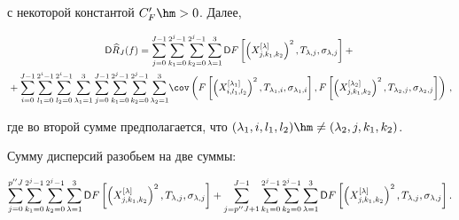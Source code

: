 с некоторой константой $C'_F\hm > 0$. Далее,


\begin{multline}                                                                        \label{Var_Struct}


\Variance \widehat{R}_J(f)


= \sum\limits_{j = 0}^{J - 1} \sum\limits_{k_1 = 0}^{2^j - 1}


\sum\limits_{k_2 = 0}^{2^j - 1} \sum\limits_{\lambda=1}^3


\Variance F\left[\left(X_{j,k_1,k_2}^{[\lambda]}\right)^2,T_{\lambda,j},\sigma_{\lambda,j}\right]+{}\\


{}+ \sum\limits_{i = 0}^{J - 1} \sum\limits_{l_1 = 0}^{2^i - 1}


\sum\limits_{l_2 = 0}^{2^i - 1} \sum\limits_{\lambda_1=1}^3


\sum\limits_{j = 0}^{J - 1}\sum\limits_{k_1 = 0}^{2^j - 1}


\sum\limits_{k_2 = 0}^{2^j - 1}\sum\limits_{\lambda_2=1}^3\!


\cov\left(F\left[\left(X_{i,l_1,l_2}^{[\lambda_1]}\right)^2,


T_{\lambda_1,i},


\sigma_{\lambda_1,i}\right], F\left[\left(X_{j,k_1,k_2}^{[\lambda_2]}\right)^2,


T_{\lambda_2,j},\sigma_{\lambda_2,j}\right]\right)\,,


\end{multline}


где во второй сумме предполагается, что $(\lambda_1,i,l_1,l_2)\hm\neq(\lambda_2,j,k_1,k_2)$.





Сумму дисперсий разобьем на две суммы:


\begin{equation*}


\sum\limits_{j = 0}^{p''J} \sum\limits_{k_1 = 0}^{2^j - 1}


\sum\limits_{k_2 = 0}^{2^j - 1}


\sum\limits_{\lambda=1}^3 \Variance F\left[\left(X_{j,k_1,k_2}^{[\lambda]}\right)^2,T_{\lambda,j},\sigma_{\lambda,j}\right]+


\sum\limits_{j = p''J + 1}^{J-1} \sum\limits_{k_1 = 0}^{2^j - 1}


\sum\limits_{k_2 = 0}^{2^j - 1}


\sum\limits_{\lambda=1}^3 \Variance F


\left[\left(X_{j,k_1,k_2}^{[\lambda]}\right)^2,T_{\lambda,j},\sigma_{\lambda,j}\right].


\end{equation*}


